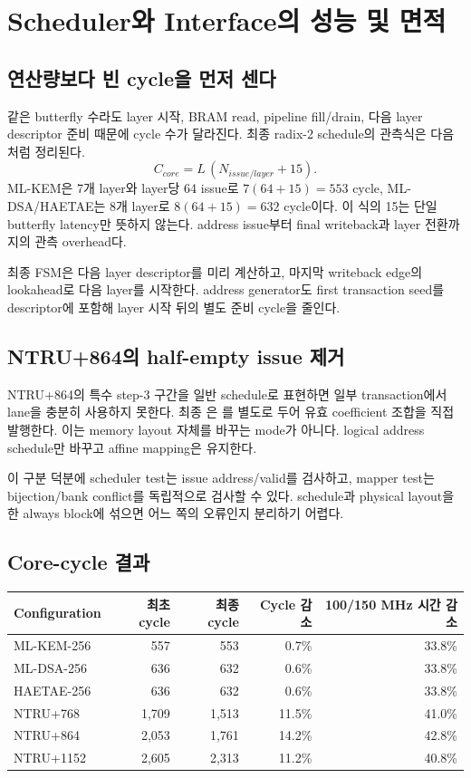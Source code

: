 \chapter{Scheduler와 Interface의 성능 및 면적}

\section{연산량보다 빈 cycle을 먼저 센다}

같은 butterfly 수라도 layer 시작, BRAM read, pipeline fill/drain, 다음 layer
descriptor 준비 때문에 cycle 수가 달라진다. 최종 radix-2 schedule의 관측식은
다음처럼 정리된다.
\[
C_{core}=L\,(N_{issue/layer}+15).
\]
ML-KEM은 7개 layer와 layer당 64 issue로 $7(64+15)=553$ cycle,
ML-DSA/HAETAE는 8개 layer로 $8(64+15)=632$ cycle이다. 이 식의 15는 단일
butterfly latency만 뜻하지 않는다. address issue부터 final writeback과 layer
전환까지의 관측 overhead다.

최종 FSM은 다음 layer descriptor를 미리 계산하고, 마지막 writeback edge의
lookahead로 다음 layer를 시작한다. address generator도 first transaction seed를
descriptor에 포함해 layer 시작 뒤의 별도 준비 cycle을 줄인다.

\section{NTRU+864의 half-empty issue 제거}

NTRU+864의 특수 step-3 구간을 일반 schedule로 표현하면 일부 transaction에서
lane을 충분히 사용하지 못한다. 최종 은
를 별도로 두어 유효 coefficient 조합을 직접
발행한다. 이는 memory layout 자체를 바꾸는 mode가 아니다. logical address
schedule만 바꾸고 affine mapping은 유지한다.

이 구분 덕분에 scheduler test는 issue address/valid를 검사하고, mapper test는
bijection/bank conflict를 독립적으로 검사할 수 있다. schedule과 physical layout을
한 always block에 섞으면 어느 쪽의 오류인지 분리하기 어렵다.

\section{Core-cycle 결과}

\begin{longtable}{L{31mm}r r r r}
\toprule
Configuration & 최초 cycle & 최종 cycle & Cycle 감소 & 100/150 MHz 시간 감소 \\
\midrule
ML-KEM-256 & 557 & 553 & 0.7\% & 33.8\% \\
ML-DSA-256 & 636 & 632 & 0.6\% & 33.8\% \\
HAETAE-256 & 636 & 632 & 0.6\% & 33.8\% \\
NTRU+768 & 1,709 & 1,513 & 11.5\% & 41.0\% \\
NTRU+864 & 2,053 & 1,761 & 14.2\% & 42.8\% \\
NTRU+1152 & 2,605 & 2,313 & 11.2\% & 40.8\% \\
\bottomrule
\end{longtable}

